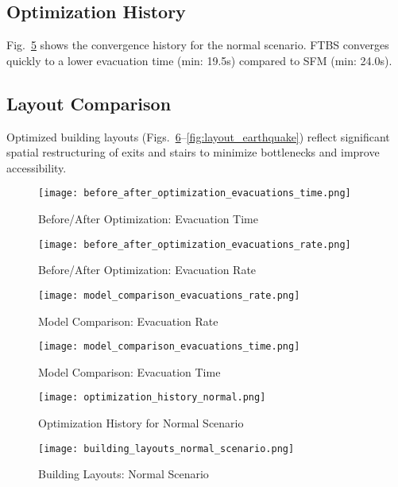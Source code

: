 \documentclass[11pt,a4paper]{article}
\begin{document}
\subsection{Optimization History}
Fig.~\ref{fig:opt_history} shows the convergence history for the normal scenario. FTBS converges quickly to a lower evacuation time (min: 19.5s) compared to SFM (min: 24.0s).

\subsection{Layout Comparison}
Optimized building layouts (Figs.~\ref{fig:layout_normal}--\ref{fig:layout_earthquake}) reflect significant spatial restructuring of exits and stairs to minimize bottlenecks and improve accessibility.

\begin{figure}[htbp]
\centering
\texttt{[image: before\_after\_optimization\_evacuations\_time.png]}
\caption{Before/After Optimization: Evacuation Time}
\label{fig:evac_time_before_after}
\end{figure}

\begin{figure}[htbp]
\centering
\texttt{[image: before\_after\_optimization\_evacuations\_rate.png]}
\caption{Before/After Optimization: Evacuation Rate}
\label{fig:evac_rate_before_after}
\end{figure}

\begin{figure}[htbp]
\centering
\texttt{[image: model\_comparison\_evacuations\_rate.png]}
\caption{Model Comparison: Evacuation Rate}
\label{fig:rate_model_comparison}
\end{figure}

\begin{figure}[htbp]
\centering
\texttt{[image: model\_comparison\_evacuations\_time.png]}
\caption{Model Comparison: Evacuation Time}
\label{fig:time_model_comparison}
\end{figure}

\begin{figure}[htbp]
\centering
\texttt{[image: optimization\_history\_normal.png]}
\caption{Optimization History for Normal Scenario}
\label{fig:opt_history}
\end{figure}

\begin{figure}[htbp]
\centering
\texttt{[image: building\_layouts\_normal\_scenario.png]}
\caption{Building Layouts: Normal Scenario}
\label{fig:layout_normal}
\end{figure}
\end{document}
